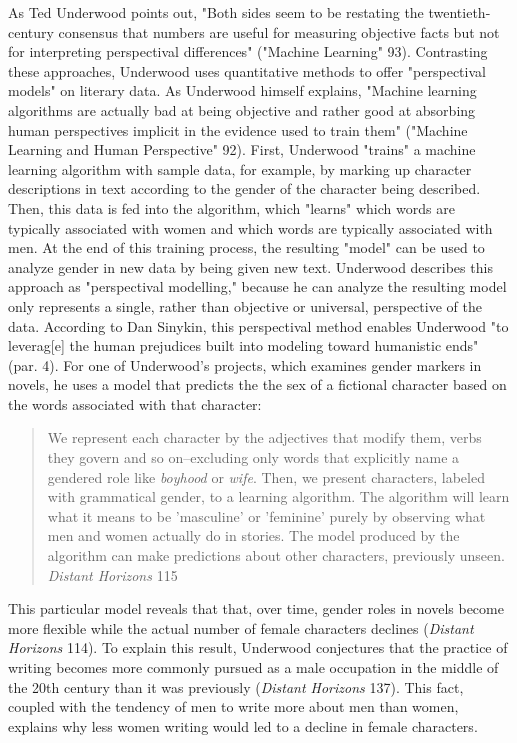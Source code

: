 \documentclass[11pt]{article}
\begin{document}
As Ted Underwood points out, "Both sides seem to be restating the
twentieth-century consensus that numbers are useful for measuring
objective facts but not for interpreting perspectival differences"
("Machine Learning" 93). Contrasting these approaches, Underwood uses
quantitative methods to offer "perspectival models" on literary
data. As Underwood himself explains, "Machine learning algorithms are
actually bad at being objective and rather good at absorbing human
perspectives implicit in the evidence used to train them" ("Machine
Learning and Human Perspective" 92). First, Underwood "trains" a
machine learning algorithm with sample data, for example, by marking
up character descriptions in text according to the gender of the
character being described. Then, this data is fed into the algorithm,
which "learns" which words are typically associated with women and
which words are typically associated with men. At the end of this
training process, the resulting "model" can be used to analyze gender
in new data by being given new text. Underwood describes this approach
as "perspectival modelling," because he can analyze the resulting
model only represents a single, rather than objective or universal,
perspective of the data. According to Dan Sinykin, this perspectival
method enables Underwood "to leverag[e] the human prejudices built
into modeling toward humanistic ends" (par. 4). For one of Underwood's
projects, which examines gender markers in novels, he uses a model
that predicts the the sex of a fictional character based on the words
associated with that character:
\begin{quote}
We represent each character by the adjectives that modify them, verbs
they govern and so on--excluding only words that explicitly name a
gendered role like \emph{boyhood} or \emph{wife}. Then, we present characters,
labeled with grammatical gender, to a learning algorithm. The
algorithm will learn what it means to be 'masculine' or 'feminine'
purely by observing what men and women actually do in stories. The
model produced by the algorithm can make predictions about other
characters, previously unseen. \emph{Distant Horizons} 115
\end{quote}
This particular model reveals that that, over time, gender roles in
novels become more flexible while the actual number of female
characters declines (\emph{Distant Horizons} 114). To explain this result,
Underwood conjectures that the practice of writing becomes more
commonly pursued as a male occupation in the middle of the 20th
century than it was previously (\emph{Distant Horizons} 137). This fact,
coupled with the tendency of men to write more about men than women,
explains why less women writing would led to a decline in female
characters.
\end{document}
